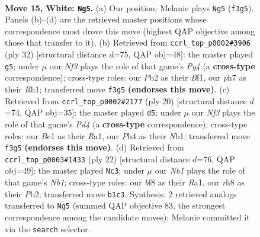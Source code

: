 \documentclass[11pt]{article}
\begin{document}
\clearpage

\begin{figure}[p]\centering
\begin{subfigure}{0.46\textwidth}\centering
\resizebox{\linewidth}{!}{%
\newchessgame
\chessboard[
  setfen={r1bqkb1r/5ppp/1pn5/p3P3/3p3P/1Q3N2/PP3PP1/RNB2RK1 w q - 0 15},
  showmover=false,
  pgfstyle=straightmove, color=movearrow, markmove={f3-g5}
]}
\caption{}
\end{subfigure}\hfill
\begin{subfigure}{0.46\textwidth}\centering
\resizebox{\linewidth}{!}{%
\newchessgame
\chessboard[
  setfen={1rb1k2r/4bppp/1qnpp3/pp6/4PPPP/PN6/1PPQN3/1K1R1B1R w k - 0 17},
  showmover=false,
  pgfstyle=straightmove, color=movearrow, markmove={g4-g5}
]}
\caption{}
\end{subfigure}
\\[4pt]
\begin{subfigure}{0.46\textwidth}\centering
\resizebox{\linewidth}{!}{%
\newchessgame
\chessboard[
  setfen={r1b1kb1r/p2n1pp1/2p2q1p/1p2p3/3PP3/1Q3N2/PP2BPPP/RN2K2R w KQkq - 0 11},
  showmover=false,
  pgfstyle=straightmove, color=movearrow, markmove={d4-d5}
]}
\caption{}
\end{subfigure}\hfill
\begin{subfigure}{0.46\textwidth}\centering
\resizebox{\linewidth}{!}{%
\newchessgame
\chessboard[
  setfen={r1b1k2r/ppq1bppp/2p2n2/8/8/1Q2PB2/PP1B1PPP/RN3RK1 w kq - 4 12},
  showmover=false,
  pgfstyle=straightmove, color=movearrow, markmove={b1-c3}
]}
\caption{}
\end{subfigure}
\caption{\textbf{Move 15, White: \texttt{Ng5}.} (a) Our position; Melanie plays \texttt{Ng5} (\texttt{f3g5}). Panels (b)--(d) are the retrieved master positions whose correspondence most drove this move (highest QAP objective among those that transfer to it). (b) Retrieved from \texttt{ccrl\_top\_p0002\#3906} (ply 32) [structural distance $d$=75, QAP obj=48]: the master played \texttt{g5}; under $\mu$ our \emph{Nf3} plays the role of that game's \emph{Pg4} (a \textbf{cross-type} correspondence); cross-type roles: our \emph{P}b2 as their \emph{B}f1, our \emph{p}h7 as their \emph{R}h1; transferred move \texttt{f3g5} \textbf{(endorses this move)}. (c) Retrieved from \texttt{ccrl\_top\_p0002\#2177} (ply 20) [structural distance $d$=74, QAP obj=35]: the master played \texttt{d5}; under $\mu$ our \emph{Nf3} plays the role of that game's \emph{Pd4} (a \textbf{cross-type} correspondence); cross-type roles: our \emph{B}c1 as their \emph{R}a1, our \emph{P}h4 as their \emph{N}b1; transferred move \texttt{f3g5} \textbf{(endorses this move)}. (d) Retrieved from \texttt{ccrl\_top\_p0003\#1433} (ply 22) [structural distance $d$=76, QAP obj=49]: the master played \texttt{Nc3}; under $\mu$ our \emph{Nb1} plays the role of that game's \emph{Nb1}; cross-type roles: our \emph{b}f8 as their \emph{R}a1, our \emph{r}h8 as their \emph{P}b2; transferred move \texttt{b1c3}. Synthesis: 2 retrieved analogs transferred to \texttt{Ng5} (summed QAP objective 83, the strongest correspondence among the candidate moves); Melanie committed it via the \texttt{search} selector.}
\label{fig:thought-m28}
\end{figure}
\end{document}
